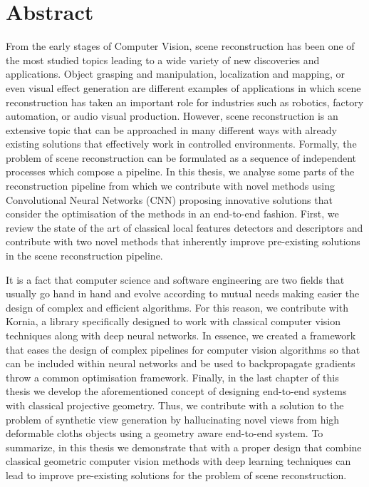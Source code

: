 


\chapter*{Abstract}

\vspace{-24mm}

From the early stages of Computer Vision, scene reconstruction has been one of the most studied topics leading to a wide variety of new discoveries and applications. Object grasping and manipulation, localization and mapping, or even visual effect generation are different examples of applications in which scene reconstruction has taken an important role for industries such as robotics, factory automation, or audio visual production. However, scene reconstruction is an extensive topic that can be approached in many different ways with already existing solutions that effectively work in controlled environments. Formally, the problem of scene reconstruction can be formulated as a sequence of independent processes which compose a pipeline. In this thesis, we analyse some parts of the reconstruction pipeline from which we contribute with novel methods using Convolutional Neural Networks (CNN) proposing innovative solutions that consider the optimisation of the methods in an end-to-end fashion. First, we review the state of the art of classical local features detectors and descriptors and contribute with two novel methods that inherently improve pre-existing solutions in the scene reconstruction pipeline.

It is a fact that computer science and software engineering are two fields that usually go hand in hand and evolve according to mutual needs making easier the design of complex and efficient algorithms. For this reason, we contribute with Kornia, a library specifically designed to work with classical computer vision techniques along with deep neural networks. In essence, we created a framework that eases the design of complex pipelines for computer vision algorithms so that can be included within neural networks and be used to backpropagate gradients throw a common optimisation framework. Finally, in the last chapter of this thesis we develop the aforementioned concept of designing end-to-end systems with classical projective geometry. Thus, we contribute with a solution to the problem of synthetic view generation by hallucinating novel views from high deformable cloths objects using a geometry aware end-to-end system. To summarize, in this thesis we demonstrate that with a proper design that combine classical geometric computer vision methods with deep learning techniques can lead to improve pre-existing solutions for the problem of scene reconstruction.

